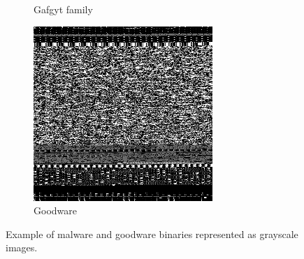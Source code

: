 \documentclass[conference, 11pt]{IEEEtran}
\begin{document}
\begin{figure}[htbp]
\begin{subfigure}{0.31\textwidth}
            \caption{Gafgyt family}
            \label{fig2b}
        \end{subfigure}%
        \hspace*{\fill}
        \begin{subfigure}{0.31\textwidth}
            \centerline{\includegraphics[width=\linewidth]{figures/goodware.png}}
            \caption{Goodware}
            \label{fig2c}
        \end{subfigure}%
        \caption{Example of malware and goodware binaries represented as grayscale images.}
        \label{fig2}
    \end{figure}
\end{document}
